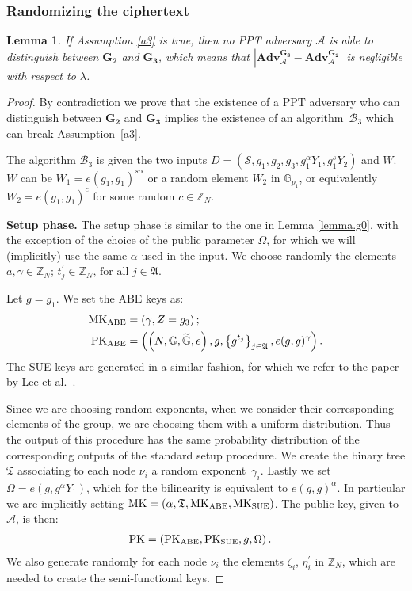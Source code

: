 \documentclass[a4paper,10pt]{article}
\newtheorem{lemma}{Lemma}
\newcommand{\G}{\mathbb{G}}
\newcommand{\GT}{\widetilde{\G}} \newcommand{\N}{\mathbb{N}}
\newcommand{\Z}{\mathbb{Z}}
\newcommand{\adv}{\textbf{Adv}}
\newcommand{\tree}{\mathfrak{T}}
\newcommand{\randomchoose}[1]{We choose randomly the element\ifstrequal{#1}{s}{}{s} }
\newcommand{\game}[2]{$\mathbf{#1_{#2}}$}
\newcommand{\mathgame}[2]{\mathbf{#1_{#2}}}
\newcommand{\phase}[1]{\textbf{#1 phase.} \hspace{0pt}}
\newcommand{\disclaimerSUE}{The SUE keys are generated in a similar fashion, for which we refer to the paper by Lee et al.~\cite{lee2013RSABE}.

}
\begin{document}
\subsubsection{Randomizing the ciphertext}
	\begin{lemma}
	\label{lemma.g2}
	If Assumption \ref{a3} is true, then no PPT adversary $\mathcal{A}$ is able to distinguish between \game{G}{2} and \game{G}{3}, which means that $\left| \adv_{\mathcal{A}}^{\mathgame{G}{3}} - \adv_{\mathcal{A}}^{\mathgame{G}{2}}\right|
	$ is negligible with respect to $\lambda$.
	\end{lemma}
	\begin{proof}
		By contradiction we prove that the existence of a PPT adversary who can distinguish between \game{G}{2} and \game{G}{3} implies the existence of an algorithm~$\mathscr{B}_3$ which can break Assumption~\ref{a3}.
		
		The algorithm $\mathscr{B}_3$ is given the two inputs $D=\left(\mathscr{S},g_1,g_2,g_3,g_1^\alpha Y_1,g_1^s Y_2\right)$ and $W$.
		$W$ can be $W_1=e(g_1,g_1)^{s\alpha}$ or a random element $W_2$ in $\G_{p_1}$, or equivalently $W_2=e(g_1,g_1)^c$ for some random $c\in \Z_N$.
		
	\phase{Setup}
	The setup phase is similar to the one in Lemma \ref{lemma.g0}, with the exception of the choice of the public parameter $\Omega$, for which we will (implicitly) use the same $\alpha$  used in the input.
	\randomchoose{p}{$a,\gamma\in\Z_N$;
$t_j^\prime \in \Z_N\text{, for all }j\in \mathfrak{A}$.
	}
	
	Let $g=g_1$. We set the ABE keys as:
	\begin{align*}
		\mathrm{MK}_{\textnormal{ABE}}&=\left( \gamma, Z=g_3 \right);\\
\mathrm{PK}_{\textnormal{ABE}}&=\left( \left(N,\G,\GT,e\right), g, \left\{g^{t_j}\right\}_{j\in \mathfrak{A}}, e(g,g)^\gamma \right).
\end{align*}
	\disclaimerSUE{}
	Since we are choosing random exponents, when we consider their corresponding elements of the group, we are choosing them with a uniform distribution. Thus the output of this procedure has the same probability distribution of the corresponding outputs of the standard setup procedure.
	We create the binary tree $\tree$ associating to each node $\nu_i$ a random exponent~$\gamma_{i}$.
	Lastly we set $\Omega=e(g,g^\alpha Y_1)$, which for the bilinearity is equivalent to $e(g,g)^\alpha$. In particular we are implicitly setting $
		\mathrm{MK}=\left(\alpha, \tree, \mathrm{MK}_{\textnormal{ABE}}, \mathrm{MK}_{\textnormal{SUE}} \right)$.
	The public key, given to $\mathcal{A}$, is then:
	\begin{align*}
		\mathrm{PK}&=\left( \mathrm{PK}_{\textnormal{ABE}}, \mathrm{PK}_{\textnormal{SUE}}, g, \Omega \right).
	\end{align*}
	We also generate randomly for each node $\nu_i$ the elements $\zeta_i$, $\eta^\prime_i$ in $\Z_N$, which are needed to create the semi-functional keys.
	

\end{proof}
\end{document}
